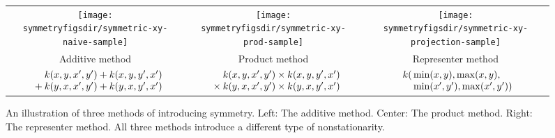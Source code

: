 \begin{figure}
\begin{tabular}{ccc}
\texttt{[image: \\symmetryfigsdir/symmetric-xy-naive-sample]} &
\texttt{[image: \\symmetryfigsdir/symmetric-xy-prod-sample]} &
\texttt{[image: \\symmetryfigsdir/symmetric-xy-projection-sample]} \\
Additive method & Product method & Representer method \\[0.5ex]
$\begin{array}{r@{}l@{}}
k(x, y, x', y') & {}+ k(x, y, y', x') \\
{}+ k(y, x, x', y') & {}+ k(y, x, y', x')
\end{array}$
&
$\begin{array}{r@{}l@{}}
k(x, y, x', y') & {}\times k(x, y, y', x') \\
{}\times k(y, x, x', y') & {}\times k(y, x, y', x')
\end{array}$
&
$\begin{array}{r@{}l@{}}
k( &{}\min(x, y), \max(x,y), \\
&{}\min(x', y'), \max(x',y') )
\end{array}$
\end{tabular}
\caption[Three ways to introduce symmetry]{An illustration of three methods of introducing symmetry.
Left:  The additive method.
Center: The product method.
Right: The representer method.
All three methods introduce a different type of nonstationarity.
}
\label{fig:add_vs_min}
\end{figure}



%

